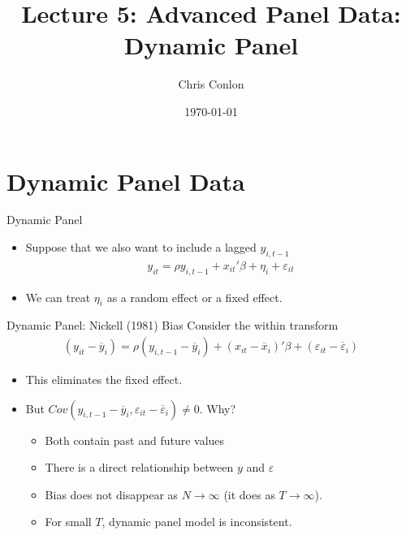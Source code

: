 \documentclass[xcolor=pdftex,dvipsnames,table,mathserif,aspectratio=169]{beamer}
\title{Lecture 5:  Advanced Panel Data: Dynamic Panel}
\author{Chris Conlon }
\institute{NYU Stern }
\date{\today}
\begin{document}
\maketitle




\section*{Dynamic Panel Data}

\begin{frame}{Dynamic Panel}
\begin{itemize}
\item Suppose that we also want to include a lagged $y_{i,t-1}$
\begin{eqnarray*}
y_{it} = \rho y_{i,t-1} + x_{it}'\beta + \eta_i + \varepsilon_{it}
\end{eqnarray*}
\item We can treat $\eta_i$ as a \alert{random effect} or a \alert{fixed effect}.
\end{itemize}
\end{frame}

\begin{frame}{Dynamic Panel: Nickell (1981) Bias}
Consider the within transform
\begin{eqnarray*}
(y_{it}-\overline{y}_i) = \rho (y_{i,t-1}-\overline{y}_i) + (x_{it}-\overline{x}_i)'\beta +( \varepsilon_{it}- \overline{\varepsilon}_{i})
\end{eqnarray*}
\begin{itemize}
\item This eliminates the fixed effect.
\item But $Cov(y_{i,t-1}-\overline{y}_i, \varepsilon_{it}- \overline{\varepsilon}_{i}) \neq0$. Why?
\begin{itemize}
\item Both contain past and future values
\item There is a direct relationship between $y$ and $\varepsilon$
\item Bias does not disappear as $N \rightarrow \infty$ (it does as $T\rightarrow \infty$).
\item For small $T$, dynamic panel model is \alert{inconsistent}.
\end{itemize}
\end{itemize}
\end{frame}
\end{document}
